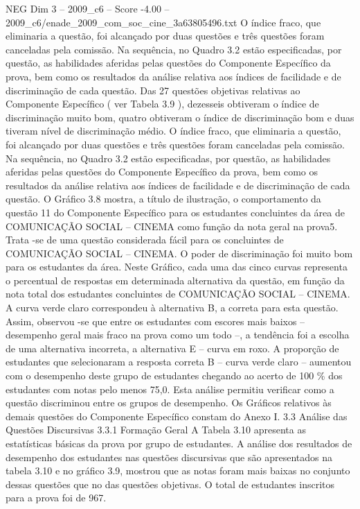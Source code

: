 \begin{textsample}{NEG Dim 3 – 2009\_c6 – Score -4.00 – 2009\_c6/enade\_2009\_com\_soc\_cine\_3a63805496.txt}
O índice fraco, que eliminaria a questão, foi alcançado por duas questões e três questões foram canceladas pela comissão.
Na sequência, no Quadro 3.2 estão especificadas, por questão, as habilidades aferidas pelas questões do Componente Específico da prova, bem como os resultados da análise relativa aos índices de facilidade e de discriminação de cada questão.
Das 27 questões objetivas relativas ao Componente Específico ( ver Tabela 3.9 ), dezesseis obtiveram o índice de discriminação muito bom, quatro obtiveram o índice de discriminação bom e duas tiveram nível de discriminação médio.
O índice fraco, que eliminaria a questão, foi alcançado por duas questões e três questões foram canceladas pela comissão.
Na sequência, no Quadro 3.2 estão especificadas, por questão, as habilidades aferidas pelas questões do Componente Específico da prova, bem como os resultados da análise relativa aos índices de facilidade e de discriminação de cada questão.
O Gráfico 3.8 mostra, a título de ilustração, o comportamento da questão 11 do Componente Específico para os estudantes concluintes da área de COMUNICAÇÃO SOCIAL – CINEMA como função da nota geral na prova5.
Trata -se de uma questão considerada fácil para os concluintes de COMUNICAÇÃO SOCIAL – CINEMA.
O poder de discriminação foi muito bom para os estudantes da área.
Neste Gráfico, cada uma das cinco curvas representa o percentual de respostas em determinada alternativa da questão, em função da nota total dos estudantes concluintes de COMUNICAÇÃO SOCIAL – CINEMA.
A curva verde claro correspondeu à alternativa B, a correta para esta questão.
Assim, observou -se que entre os estudantes com escores mais baixos – desempenho geral mais fraco na prova como um todo –, a tendência foi a escolha de uma alternativa incorreta, a alternativa E – curva em roxo.
A proporção de estudantes que selecionaram a resposta correta B – curva verde claro – aumentou com o desempenho deste grupo de estudantes chegando ao acerto de 100 \% dos estudantes com notas pelo menos 75,0.
Esta análise permitiu verificar como a questão discriminou entre os grupos de desempenho.
Os Gráficos relativos às demais questões do Componente Específico constam do Anexo I. 3.3 Análise das Questões Discursivas 3.3.1 Formação Geral A Tabela 3.10 apresenta as estatísticas básicas da prova por grupo de estudantes.
A análise dos resultados de desempenho dos estudantes nas questões discursivas que são apresentados na tabela 3.10 e no gráfico 3.9, mostrou que as notas foram mais baixas no conjunto dessas questões que no das questões objetivas.
O total de estudantes inscritos para a prova foi de 967.

\end{textsample}

